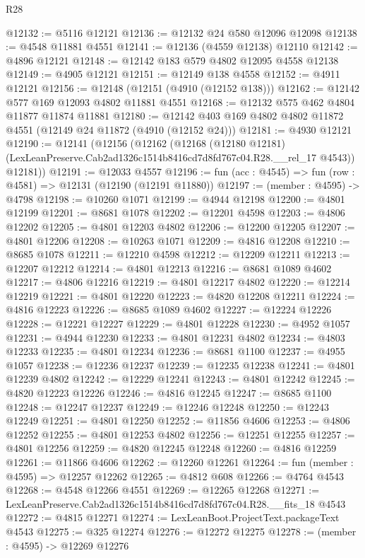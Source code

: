 \begin{lexlean}{R28}
\begin{coremodule}
@12132 := @5116 @12121
@12136 := @12132 @24 @580 @12096 @12098
@12138 := @4548 @11881 @4551
@12141 := @12136 (@4559 @12138) @12110
@12142 := @4896 @12121
@12148 := @12142 @183 @579 @4802 @12095 @4558 @12138
@12149 := @4905 @12121
@12151 := @12149 @138 @4558
@12152 := @4911 @12121
@12156 := @12148 (@12151 (@4910 (@12152 @138)))
@12162 := @12142 @577 @169 @12093 @4802 @11881 @4551
@12168 := @12132 @575 @462 @4804 @11877 @11874 @11881
@12180 := @12142 @403 @169 @4802 @4802 @11872 @4551 (@12149 @24 @11872 (@4910 (@12152 @24)))
@12181 := @4930 @12121
@12190 := @12141
    (@12156
      (@12162
        (@12168
          (@12180 @12181)
          (LexLeanPreserve.Cab2ad1326c1514b8416cd7d8fd767c04.R28.__rel_17 @4543))
        @12181))
@12191 := @12033 @4557
@12196 := fun (acc : @4545) => fun (row : @4581) => @12131 (@12190 (@12191 @11880))
@12197 := (member : @4595) -> @4798
@12198 := @10260 @1071
@12199 := @4944 @12198
@12200 := @4801 @12199
@12201 := @8681 @1078
@12202 := @12201 @4598
@12203 := @4806 @12202
@12205 := @4801 @12203 @4802
@12206 := @12200 @12205
@12207 := @4801 @12206
@12208 := @10263 @1071
@12209 := @4816 @12208
@12210 := @8685 @1078
@12211 := @12210 @4598
@12212 := @12209 @12211
@12213 := @12207 @12212
@12214 := @4801 @12213
@12216 := @8681 @1089 @4602
@12217 := @4806 @12216
@12219 := @4801 @12217 @4802
@12220 := @12214 @12219
@12221 := @4801 @12220
@12223 := @4820 @12208 @12211
@12224 := @4816 @12223
@12226 := @8685 @1089 @4602
@12227 := @12224 @12226
@12228 := @12221 @12227
@12229 := @4801 @12228
@12230 := @4952 @1057
@12231 := @4944 @12230
@12233 := @4801 @12231 @4802
@12234 := @4803 @12233
@12235 := @4801 @12234
@12236 := @8681 @1100
@12237 := @4955 @1057
@12238 := @12236 @12237
@12239 := @12235 @12238
@12241 := @4801 @12239 @4802
@12242 := @12229 @12241
@12243 := @4801 @12242
@12245 := @4820 @12223 @12226
@12246 := @4816 @12245
@12247 := @8685 @1100
@12248 := @12247 @12237
@12249 := @12246 @12248
@12250 := @12243 @12249
@12251 := @4801 @12250
@12252 := @11856 @4606
@12253 := @4806 @12252
@12255 := @4801 @12253 @4802
@12256 := @12251 @12255
@12257 := @4801 @12256
@12259 := @4820 @12245 @12248
@12260 := @4816 @12259
@12261 := @11866 @4606
@12262 := @12260 @12261
@12264 := fun (member : @4595) => @12257 @12262
@12265 := @4812 @608
@12266 := @4764 @4543
@12268 := @4548 @12266 @4551
@12269 := @12265 @12268
@12271 := LexLeanPreserve.Cab2ad1326c1514b8416cd7d8fd767c04.R28.__fits_18 @4543
@12272 := @4815 @12271
@12274 := LexLeanBoot.ProjectText.packageText @4543
@12275 := @325 @12274
@12276 := @12272 @12275
@12278 := (member : @4595) -> @12269 @12276

\end{coremodule}
\end{lexlean}
